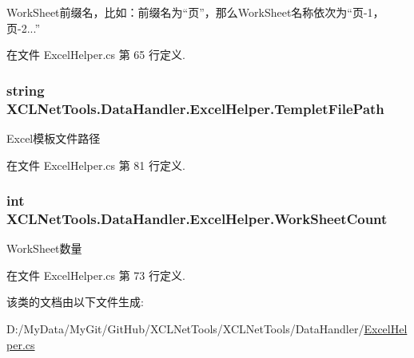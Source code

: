 Work\-Sheet前缀名，比如：前缀名为“页”，那么\-Work\-Sheet名称依次为“页-\/1，页-\/2...” 



在文件 Excel\-Helper.\-cs 第 65 行定义.

\hypertarget{class_x_c_l_net_tools_1_1_data_handler_1_1_excel_helper_a0e4501c60ef6446d0fe8151a6e58fca4}{
\subsubsection[{Templet\-File\-Path}]{\setlength{\rightskip}{0pt plus 5cm}string X\-C\-L\-Net\-Tools.\-Data\-Handler.\-Excel\-Helper.\-Templet\-File\-Path\hspace{0.3cm}{\ttfamily [set]}}}\label{class_x_c_l_net_tools_1_1_data_handler_1_1_excel_helper_a0e4501c60ef6446d0fe8151a6e58fca4}


Excel模板文件路径 



在文件 Excel\-Helper.\-cs 第 81 行定义.

\hypertarget{class_x_c_l_net_tools_1_1_data_handler_1_1_excel_helper_ab8d2677869ff64e25bbe54623ef9fa86}{
\subsubsection[{Work\-Sheet\-Count}]{\setlength{\rightskip}{0pt plus 5cm}int X\-C\-L\-Net\-Tools.\-Data\-Handler.\-Excel\-Helper.\-Work\-Sheet\-Count\hspace{0.3cm}{\ttfamily [get]}}}\label{class_x_c_l_net_tools_1_1_data_handler_1_1_excel_helper_ab8d2677869ff64e25bbe54623ef9fa86}


Work\-Sheet数量 



在文件 Excel\-Helper.\-cs 第 73 行定义.



该类的文档由以下文件生成\-:\begin{DoxyCompactItemize}
\item 
D\-:/\-My\-Data/\-My\-Git/\-Git\-Hub/\-X\-C\-L\-Net\-Tools/\-X\-C\-L\-Net\-Tools/\-Data\-Handler/\hyperlink{_excel_helper_8cs}{Excel\-Helper.\-cs}\end{DoxyCompactItemize}
